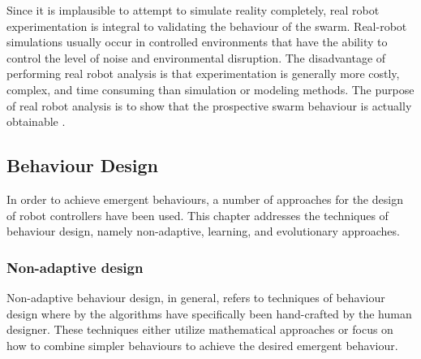 Since it is implausible to attempt to simulate reality completely, real robot experimentation is integral to validating the behaviour of the swarm. Real-robot simulations usually occur in controlled environments that have the ability to control the level of noise and environmental disruption. 
The disadvantage of performing real robot analysis is that experimentation is generally more costly, complex, and time consuming than simulation or modeling methods. The purpose of real robot analysis is to show that the prospective swarm behaviour is actually obtainable \cite{brambilla2013swarm}.

\subsection{Behaviour Design}

In order to achieve emergent behaviours, a number of approaches for the design of robot controllers have been used. This chapter addresses the techniques of behaviour design, namely non-adaptive, learning, and evolutionary approaches.

\subsubsection{Non-adaptive design}
Non-adaptive behaviour design, in general, refers to techniques of behaviour design where by the algorithms have specifically been hand-crafted by the human designer. These techniques either utilize mathematical approaches or focus on how to combine simpler behaviours to achieve the desired emergent behaviour. 

